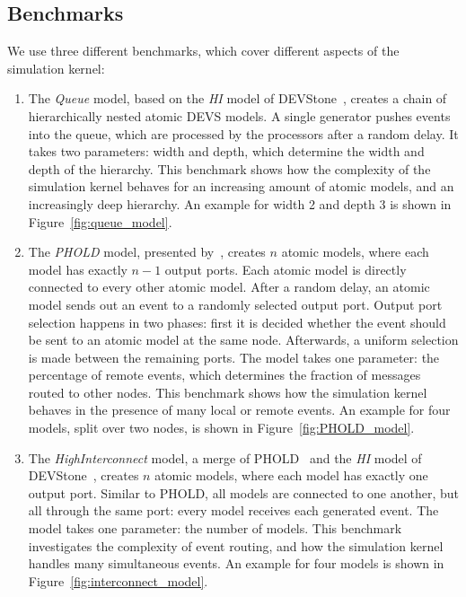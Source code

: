 \subsection{Benchmarks}
We use three different benchmarks, which cover different aspects of the simulation kernel:
\begin{enumerate}
    \item The \textit{Queue} model, based on the \textit{HI} model of DEVStone~\cite{DEVStone}, creates a chain of hierarchically nested atomic \textsf{DEVS} models.
          A single generator pushes events into the queue, which are processed by the processors after a random delay.
          It takes two parameters: width and depth, which determine the width and depth of the hierarchy.
          This benchmark shows how the complexity of the simulation kernel behaves for an increasing amount of atomic models, and an increasingly deep hierarchy.
          An example for width 2 and depth 3 is shown in Figure~\ref{fig:queue_model}.

    \item The \textit{PHOLD} model, presented by~\cite{PHOLD}, creates $n$ atomic models, where each model has exactly $n-1$ output ports.
          Each atomic model is directly connected to every other atomic model.
          After a random delay, an atomic model sends out an event to a randomly selected output port.
          Output port selection happens in two phases: first it is decided whether the event should be sent to an atomic model at the same node.
          Afterwards, a uniform selection is made between the remaining ports.
          The model takes one parameter: the percentage of remote events, which determines the fraction of messages routed to other nodes.
          This benchmark shows how the simulation kernel behaves in the presence of many local or remote events.
          An example for four models, split over two nodes, is shown in Figure~\ref{fig:PHOLD_model}.

    \item The \textit{HighInterconnect} model, a merge of PHOLD~\cite{PHOLD} and the \textit{HI} model of DEVStone~\cite{DEVStone}, creates $n$ atomic models, where each model has exactly one output port.
          Similar to PHOLD, all models are connected to one another, but all through the same port: every model receives each generated event.
          The model takes one parameter: the number of models.
          This benchmark investigates the complexity of event routing, and how the simulation kernel handles many simultaneous events.
          An example for four models is shown in Figure~\ref{fig:interconnect_model}.
\end{enumerate}

